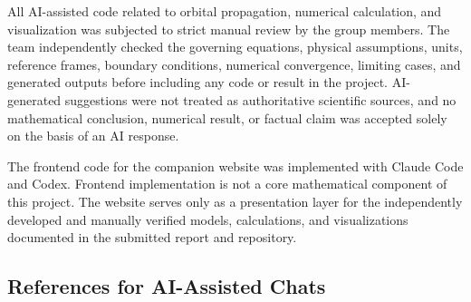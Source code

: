 \documentclass[11pt,a4paper]{article}
\begin{document}
All AI-assisted code related to orbital propagation, numerical calculation, and
visualization was subjected to strict manual review by the group members. The
team independently checked the governing equations, physical assumptions,
units, reference frames, boundary conditions, numerical convergence, limiting
cases, and generated outputs before including any code or result in the
project. AI-generated suggestions were not treated as authoritative scientific
sources, and no mathematical conclusion, numerical result, or factual claim was
accepted solely on the basis of an AI response.

The frontend code for the companion website was implemented with Claude Code
and Codex. Frontend implementation is not a core mathematical component of this
project. The website serves only as a presentation layer for the independently
developed and manually verified models, calculations, and visualizations
documented in the submitted report and repository.

\clearpage
\subsection{References for AI-Assisted Chats}
\label{app:ai-chat-references}

\begingroup
\small
\setlength{\emergencystretch}{3em}
\end{document}
